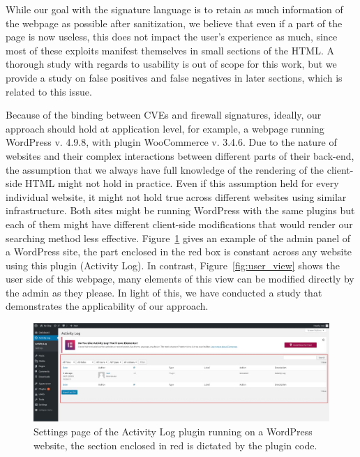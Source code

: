 While our goal with the signature language is to retain as much information of the webpage as possible after sanitization, we believe that even if a part of the page is now useless, this does not impact the user's experience as much, since most of these exploits manifest themselves in small sections of the HTML. A thorough study with regards to usability is out of scope for this work, but we provide a study on false positives and false negatives in later sections, which is related to this issue.



\iffalse
Because of the binding between CVEs and firewall signatures, ideally, our approach should hold at application level, for example, a webpage running WordPress v. 4.9.8, with plugin WooCommerce v. 3.4.6. Due to the nature of websites and their complex interactions between different parts of their back-end, the assumption that we always have full knowledge of the rendering of the client-side HTML might not hold in practice. Even if this assumption held for every individual website, it might not hold true across different websites using similar infrastructure. Both sites might be running WordPress with the same plugins but each of them might have different client-side modifications that would render our searching method less effective. Figure~\ref{fig:admin_view} gives an example of the admin panel of a WordPress site, the part enclosed in the red box is constant across any website using this plugin (Activity Log). In contrast, Figure~\ref{fig:user_view} shows the user side of this webpage, many elements of this view can be modified directly by the admin as they please.  In light of this, we have conducted a study that demonstrates the applicability of our approach.

\begin{figure}[h]
	\includegraphics[scale=0.25]{img/admin_view.JPG}
	\caption{Settings page of the Activity Log plugin running on a WordPress website, the section enclosed in red is dictated by the plugin code.}
	\label{fig:admin_view}
\end{figure}

